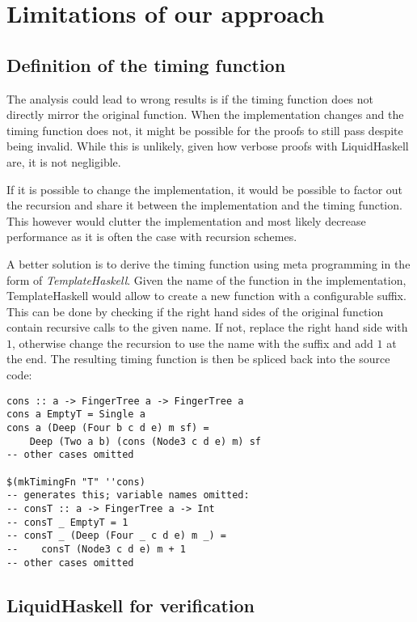 \documentclass[sigplan,screen]{acmart}
\begin{document}
\section{Limitations of our approach}\label{sec:limitations}

\subsection{Definition of the timing function}

The analysis could lead to wrong results is if the timing function does not directly mirror the original function. When the implementation changes and the timing function does not, it might be possible for the proofs to still pass despite being invalid. While this is unlikely, given how verbose proofs with LiquidHaskell are, it is not negligible.

If it is possible to change the implementation, it would be possible to factor out the recursion and share it between the implementation and the timing function. This however would clutter the implementation and most likely decrease performance as it is often the case with recursion schemes.

A better solution is to derive the timing function using meta programming in the form of \textit{TemplateHaskell}. Given the name of the function in the implementation, TemplateHaskell would allow to create a new function with a configurable suffix. This can be done by checking if the right hand sides of the original function contain recursive calls to the given name. If not, replace the right hand side with $1$, otherwise change the recursion to use the name with the suffix and add $1$ at the end. The resulting timing function is then be spliced back into the source code:

\begin{lstlisting}
cons :: a -> FingerTree a -> FingerTree a
cons a EmptyT = Single a
cons a (Deep (Four b c d e) m sf) =
    Deep (Two a b) (cons (Node3 c d e) m) sf
-- other cases omitted

$(mkTimingFn "T" ''cons)
-- generates this; variable names omitted:
-- consT :: a -> FingerTree a -> Int
-- consT _ EmptyT = 1
-- consT _ (Deep (Four _ c d e) m _) =
--    consT (Node3 c d e) m + 1
-- other cases omitted
\end{lstlisting}

\subsection{LiquidHaskell for verification}
\end{document}

